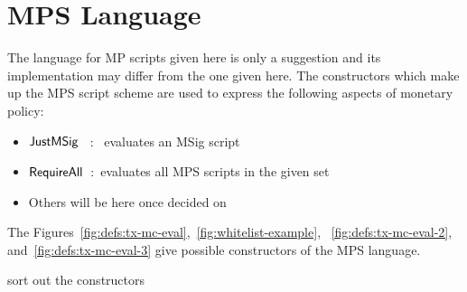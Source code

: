 \section{MPS Language}
\label{sec:mps-lang}
The language for MP scripts given here is only a suggestion and its
implementation may differ from the one given here. The constructors which make
up the MPS script scheme are used to express the following
aspects of monetary policy:

\begin{itemize}
\item $\mathsf{JustMSig}$~ :~ evaluates an MSig script

\item $\mathsf{RequireAll}$~:~evaluates all MPS scripts in the given set

\item Others will be here once decided on
\end{itemize}

The Figures~\ref{fig:defs:tx-mc-eval},~\ref{fig:whitelist-example},
~\ref{fig:defs:tx-mc-eval-2}, and~\ref{fig:defs:tx-mc-eval-3} give
possible constructors of the MPS language.

\begin{note}
  sort out the constructors
\end{note}

